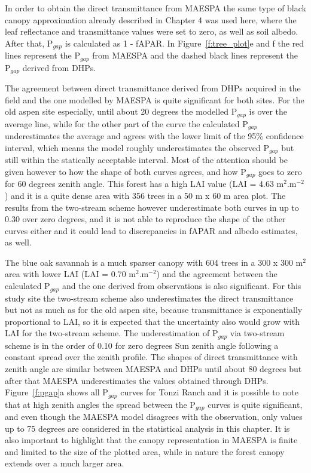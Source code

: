 \documentclass[a4paper,11pt]{report}
\begin{document}
In order to obtain the direct transmittance from MAESPA the same type of black canopy approximation already described in Chapter 4 was used here, where the leaf reflectance and transmittance values were set to zero, as well as soil albedo. After that, P$_{gap}$ is calculated as 1 - fAPAR. In Figure~\ref{f:tree_plot}e and f the red lines represent the P$_{gap}$ from MAESPA and the dashed black lines represent the P$_{gap}$ derived from DHPs.

The agreement between direct transmittance derived from DHPs acquired in the field and the one modelled by MAESPA is quite significant for both sites. For the old aspen site especially, until about 20 degrees the modelled P$_{gap}$ is over the average line, while for the other part of the curve the calculated P$_{gap}$ underestimates the average and agrees with the lower limit of the 95\% confidence interval, which means the model roughly underestimates the observed P$_{gap}$ but still within the statically acceptable interval. Most of the attention should be given however to how the shape of both curves agrees, and how P$_{gap}$ goes to zero for 60 degrees zenith angle. This forest has a high LAI value (LAI = 4.63 m$^{2}$.m$^{-2}$) and it is a quite dense area with 356 trees in a 50 m x 60 m area plot. The results from the two-stream scheme however underestimate both curves in up to 0.30 over zero degrees, and it is not able to reproduce the shape of the other curves either and it could lead to discrepancies in fAPAR and albedo estimates, as well.

The blue oak savannah is a much sparser canopy with 604 trees in a 300 x 300 m$^2$ area with lower LAI (LAI = 0.70 m$^{2}$.m$^{-2}$) and the agreement between the calculated P$_{gap}$ and the one derived from observations is also significant. For this study site the two-stream scheme also underestimates the direct transmittance but not as much as for the old aspen site, because transmittance is exponentially proportional to LAI, so it is expected that the uncertainty also would grow with LAI for the two-stream scheme. 
The underestimation of P$_{gap}$ via two-stream scheme is in the order of 0.10 for zero degrees Sun zenith angle following a constant spread over the zenith profile. The shapes of direct transmittance with zenith angle are similar between MAESPA and DHPs until about 80 degrees but after that MAESPA underestimates the values obtained through DHPs. 
Figure~\ref{f:pgap}a shows all P$_{gap}$ curves for Tonzi Ranch and it is possible to note that at high zenith angles the spread between the P$_{gap}$ curves is quite significant, and even though the MAESPA model disagrees with the observation, only values up to 75 degrees are considered in the statistical analysis in this chapter. It is also important to highlight that the canopy representation in MAESPA is finite and limited to the size of the plotted area, while in nature the forest canopy extends over a much larger area.
\end{document}
